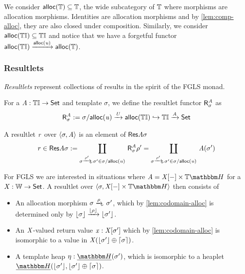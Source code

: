 \begin{definition}
    We consider $\mathsf{alloc}(\mathbb{T}) \subseteq \mathbb{T}$, the wide subcategory of $\mathbb{T}$ where morphisms are allocation morphisms.
    Identities are allocation morphisms and by \cref{lem:comp-alloc}, they are also closed under composition.
    Similarly, we consider $\mathsf{alloc}({\mathbb{T}\mathbb{I}}) \subseteq {\mathbb{T}\mathbb{I}}$ and notice that we have a forgetful functor $\mathsf{alloc}({\mathbb{T}\mathbb{I}}) \xrightarrow{\mathsf{alloc}(\mathit{u})} \mathsf{alloc}(\mathbb{T})$.
\end{definition}

\subsubsection{Resultlets}

\emph{Resultlets} represent collections of results in the spirit of the FGLS monad.

\begin{definition}
    For a $\mathit{A} : {\mathbb{T}\mathbb{I}} \to \mathsf{Set}$ and template $\sigma$, we define the resultlet functor $\mathsf{R}^{\mathit{A}}_\sigma$ as
    \[ \mathsf{R}^{\mathit{A}}_\sigma := {\sigma}/{\mathsf{alloc}(\mathit{u})} \xrightarrow{\mathit{U}} \mathsf{alloc}({\mathbb{T}\mathbb{I}}) \hookrightarrow {\mathbb{T}\mathbb{I}} \xrightarrow{\mathit{A}} \mathsf{Set} \]

    A resultlet $\mathit{r}$ over $\langle\sigma, \mathit{A}\rangle$ is an element of $\mathsf{Res}\mathit{A}\sigma$
    \[ \vr \in \typeRes\vA\sigma \eqdef \Coprod{\sigma \xato{\rho'} \sigma' \in \sliceC\sigma{\allocC\tinstU}}  \resF\vA_\sigma\rho' = 
        \Coprod{\sigma \xato{\rho'} \sigma' \in \sliceC\sigma{\allocC\tinstU}} \vA(\sigma') \]
\end{definition}

\begin{remark}
For FGLS we are interested in situations where $\vA = \vX\anyL\dash \times \theapF$ for a $\mathit{X} : \mathbb{W} \to \mathsf{Set}$.
A resultlet over $\pair\sigma{\vX\anyL\dash \times \theapF}$ then consists of
\begin{itemize}
    \item An allocation morphism $\sigma \xato\rho \sigma'$, which by \cref{lem:codomain-alloc} 
            is determined only by $\lfloor\sigma\rfloor \xrightarrow{\lfloor\rho\rfloor} \lfloor\sigma'\rfloor$.
        \item An $\mathit{X}$-valued return value $\mathit{x} : \mathit{X}[\sigma']$ which by \cref{lem:codomain-alloc}
                is isomorphic to a value in $\mathit{X}(\lfloor\sigma'\rfloor \oplus \lceil\sigma\rceil)$.
    \item A template heap $\mvarM : \dheapF(\sigma')$, which is isomorphic to 
            a heaplet $\dheapF(\concL{\sigma'}, \concL{\sigma'} \oplus \varL\sigma)$.
\end{itemize}
\end{remark}

